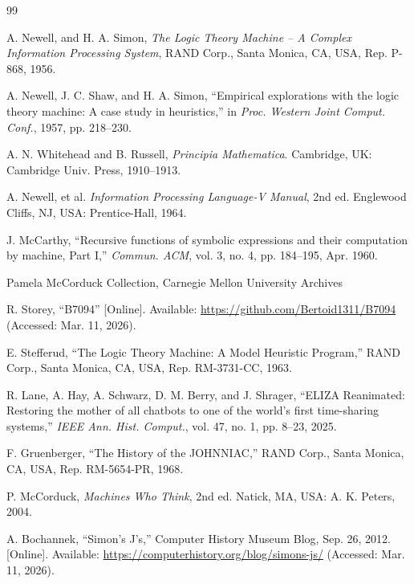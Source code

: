 \documentclass[journal]{IEEEtran}
\begin{document}
\begin{thebibliography}{99}

 A. Newell, and H. A. Simon, \textit{The Logic Theory
  Machine -- A Complex Information Processing System}, RAND Corp.,
  Santa Monica, CA, USA, Rep. P-868, 1956.

 A. Newell, J. C. Shaw, and H. A. Simon, ``Empirical
  explorations with the logic theory machine: A case study in
  heuristics,'' in \textit{Proc. Western Joint Comput. Conf.}, 1957,
  pp. 218--230.

 A. N. Whitehead and B. Russell,
  \textit{Principia Mathematica}. Cambridge, UK: Cambridge
  Univ. Press, 1910--1913.

 A. Newell, et al. \textit{Information
  Processing Language-V Manual}, 2nd ed. Englewood Cliffs, NJ, USA:
  Prentice-Hall, 1964.

 J. McCarthy, ``Recursive functions of
  symbolic expressions and their computation by machine, Part I,''
  \textit{Commun. ACM}, vol. 3, no. 4, pp. 184--195, Apr. 1960.

  Pamela McCorduck Collection, Carnegie Mellon University Archives

 R. Storey, ``B7094'' [Online]. Available:
  \url{https://github.com/Bertoid1311/B7094} (Accessed: Mar. 11,
  2026).

 E. Stefferud, ``The Logic Theory Machine: A
  Model Heuristic Program,'' RAND Corp., Santa Monica, CA, USA,
  Rep. RM-3731-CC, 1963.

 R. Lane, A. Hay, A. Schwarz, D. M. Berry, and
  J. Shrager, ``ELIZA Reanimated: Restoring the mother of all chatbots
  to one of the world's first time-sharing systems,'' \textit{IEEE
    Ann. Hist. Comput.}, vol. 47, no. 1, pp. 8--23, 2025.

 F. Gruenberger, ``The History of the
  JOHNNIAC,'' RAND Corp., Santa Monica, CA, USA, Rep. RM-5654-PR,
  1968.

 P. McCorduck, \textit{Machines Who
  Think}, 2nd ed. Natick, MA, USA: A. K. Peters, 2004.

 A. Bochannek, ``Simon’s J’s,''
  Computer History Museum Blog, Sep. 26, 2012. [Online]. Available:
  \url{https://computerhistory.org/blog/simons-js/} (Accessed:
  Mar. 11, 2026).


\end{thebibliography}
\end{document}
